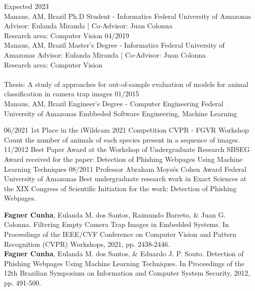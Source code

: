 \documentclass[10pt]{developercv} %
\begin{document}

\begin{entrylist}
  \entry
  {Expected 2023\\\footnotesize{Manaus, AM, Brazil}}
  {Ph.D Student - Informatics}
  {Federal University of Amazonas}
  {Advisor: Eulanda Miranda | Co-Advisor: Juan Colonna\\
  Research area: Computer Vision}
  \entry
  {04/2019\\\footnotesize{Manaus, AM, Brazil}}
  {Master's Degree - Informatics}
  {Federal University of Amazonas}
  {Advisor: Eulanda Miranda | Co-Advisor: Juan Colonna\\
  Research area: Computer Vision\\\\
 Thesis: A study of approaches for out-of-sample evaluation of models for 
animal classification in camera trap images}
  \entry
  {01/2015\\\footnotesize{Manaus, AM, Brazil}}
  {Engineer's Degree - Computer Engineering}
  {Federal University of Amazonas}
  {Embbeded Software Engineering, Machine Learning}
\end{entrylist}



\begin{entrylist}
  \entry
  {06/2021}
  {1st Place in the iWildcam 2021 Competition}
  {CVPR - FGVR Workshop}
  {Count the number of animals of each species present in a sequence of images.}
  \entry
  {11/2012}
  {Best Paper Award at the Workshop of Undergraduate Research}
  {SBSEG}
  {Award received for the paper: Detection 
of Phishing Webpages Using Machine Learning Techniques}
  \entry
  {08/2011}
  {Professor Abraham Moysés Cohen Award}
  {Federal University of Amazonas}
  {Best undergraduate research work in Exact Sciences at the XIX Congress of 
Scientific Initiation for the work: Detection of Phishing Webpages.}
\end{entrylist}



\begin{minipage}[t]{\textwidth}

\textbf{Fagner Cunha}, Eulanda M. dos Santos, Raimundo Barreto, \& Juan G. 
Colonna. Filtering Empty Camera Trap Images in Embedded Systems. In Proceedings 
of the IEEE/CVF Conference on Computer Vision and Pattern 
Recognition (CVPR) Workshops, 2021, pp. 2438-2446.\\

\textbf{Fagner Cunha}, Eulanda M. dos Santos, \& Eduardo J. P. Souto. Detection 
of Phishing Webpages Using Machine Learning Techniques. In Proceedings 
of the 12th Brazilian Symposium on Information and Computer System Security, 
2012, pp. 491-500.
\end{minipage}
\end{document}
